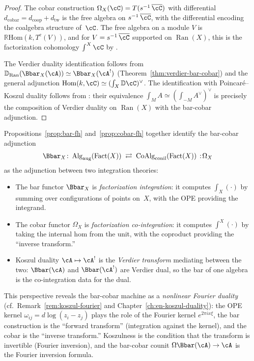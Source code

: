 \begin{proof}
The cobar construction $\Omega_X(\cC) = T(s^{-1}\,\overline{\cC})$ with
differential $d_{\mathrm{cobar}} = d_{\mathrm{coop}} +
d_{\mathrm{tw}}$ is the free algebra on $s^{-1}\,\overline{\cC}$, with
the differential encoding the coalgebra structure of~$\cC$.
The free algebra on a module $V$ is
$\mathbb{R}\mathrm{Hom}(k, T^c(V))$, and for
$V = s^{-1}\,\overline{\cC}$ supported on $\operatorname{Ran}(X)$, this
is the factorization cohomology $\int^X\cC$ by
\cite[Proposition~5.5.2.5]{HA}.

The Verdier duality identification follows from
$\mathbb{D}_{\mathrm{Ran}}(\Bbar_X(\cA)) \simeq \Bbar_X(\cA^!)$
(Theorem~\ref{thm:verdier-bar-cobar}) and the general adjunction
$\mathrm{Hom}(k, \cC) \simeq (\int_X \mathbb{D}\cC)^\vee$.
The identification with Poincar\'e--Koszul duality follows from
\cite[Theorem~4.13]{AF15}: their equivalence
$\int_M A \simeq (\int_{-M} A^\vee)^\vee$ is precisely the
composition of Verdier duality on $\operatorname{Ran}(X)$ with
the bar-cobar adjunction.
\end{proof}

\begin{remark}
\label{rem:bar-cobar-integration}
Propositions~\ref{prop:bar-fh} and~\ref{prop:cobar-fh} together
identify the bar-cobar adjunction
\[
\Bbar_X \colon
\operatorname{Alg}_{\mathrm{aug}}(\operatorname{Fact}(X))
\;\rightleftarrows\;
\operatorname{CoAlg}_{\mathrm{conil}}(\operatorname{Fact}(X))
\,:\!\Omega_X
\]
as the adjunction between two integration theories:
\begin{itemize}
\item The bar functor $\Bbar_X$ is \emph{factorization integration}:
it computes $\int_X(\cdot)$ by summing over configurations of
points on~$X$, with the OPE providing the integrand.
\item The cobar functor $\Omega_X$ is \emph{factorization
co-integration}: it computes $\int^X(\cdot)$ by taking the
internal hom from the unit, with the coproduct providing the
``inverse transform.''
\item Koszul duality $\cA \mapsto \cA^!$ is the
\emph{Verdier transform} mediating between the two:
$\Bbar(\cA)$ and $\Bbar(\cA^!)$ are Verdier dual, so the
bar of one algebra is the co-integration data for the dual.
\end{itemize}

This perspective reveals the bar-cobar machine as a
\emph{nonlinear Fourier duality} (cf.\
Remark~\ref{rem:koszul-fourier} and
Chapter~\ref{ch:en-koszul-duality}): the OPE kernel
$\omega_{ij} = d\log(z_i - z_j)$ plays the role of the Fourier
kernel $e^{2\pi i x\xi}$, the bar construction is the ``forward
transform'' (integration against the kernel), and the cobar is the
``inverse transform.''  Koszulness is the condition that the
transform is invertible (Fourier inversion), and the bar-cobar
counit $\Omega\Bbar(\cA) \to \cA$ is the Fourier inversion formula.
\end{remark}

